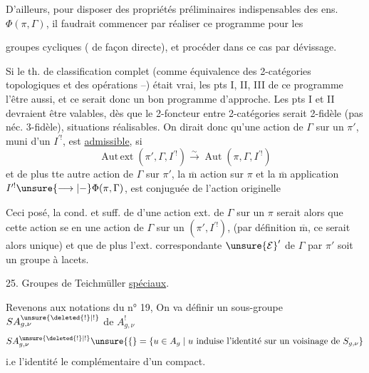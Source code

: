 D'ailleurs, pour disposer des propriétés préliminaires indispensables des ens. $\Phi(\pi,\Gamma)$, il faudrait commencer par réaliser ce programme pour les

groupes cycliques ( de façon directe), et procéder dans ce cas par dévissage.

Si le th. de classification complet (comme équivalence des 2-catégories  topologiques et des opérations  --) était vrai, les pts I, II, III de ce programme  l'être aussi, et ce serait donc un bon programme d'approche. Les pts I et II devraient être valables, dès que le 2-foncteur entre 2-catégories serait 2-fidèle (pas néc.  3-fidèle),   situations réalisables. On dirait donc qu'une action  de $\Gamma$ sur un $\pi'$, muni d'un $I^{\prime !}$, est \uline{admissible}, si 
\[
\operatorname{Aut\,ext}(\pi',\Gamma,I^{\prime !})\xrightarrow{\sim}\operatorname{Aut}(\pi,\Gamma,I^{\prime !})
\]
et  de plus tte  autre action de $\Gamma$ sur $\pi'$,  la $\overline{\mathrm m}$ action sur $\pi$ et la $\overline{\mathrm m}$ application $I^{\prime !}\unsure{\longrightarrow|{-}}\Phi(\pi,\Gamma)$, est conjuguée de l'action originelle

Ceci posé, la cond.  et suff. de  d'une action ext.  de $\Gamma$ sur un $\pi$ serait alors que cette action se   en une action  de $\Gamma$ sur un $(\pi',I^{\prime !})$,  (par définition $\overline{\mathrm m}$, ce  serait  alors  unique) et que de plus l'ext. correspondante $\unsure{\mathcal E}'$ de $\Gamma$ par $\pi'$ soit un groupe à lacets.

25. Groupes de Teichmüller \uline{spéciaux}.

Revenons aux notations du n° 19, On va définir un sous-groupe $SA_{g,\nu}^{\unsure{\deleted{!}|!}}$ de $A_{g,\nu}^{!}$
\[
SA_{g,\nu}^{\unsure{\deleted{!}|!}}\unsure{\{} =
\{u\in A_g\mid u\text{ induise l'identité sur un voisinage de }S_{g,\nu}\}
\]
i.e   l'identité  le complémentaire d'un compact.

